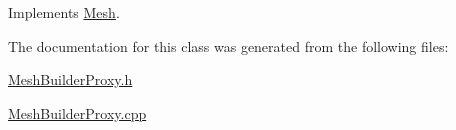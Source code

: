 Implements \mbox{\hyperlink{class_mesh_ae1d22f25fdcadd6dc58793462ffa65a6}{Mesh}}.



The documentation for this class was generated from the following files\+:\begin{DoxyCompactItemize}
\item 
\mbox{\hyperlink{_mesh_builder_proxy_8h}{Mesh\+Builder\+Proxy.\+h}}\item 
\mbox{\hyperlink{_mesh_builder_proxy_8cpp}{Mesh\+Builder\+Proxy.\+cpp}}\end{DoxyCompactItemize}
